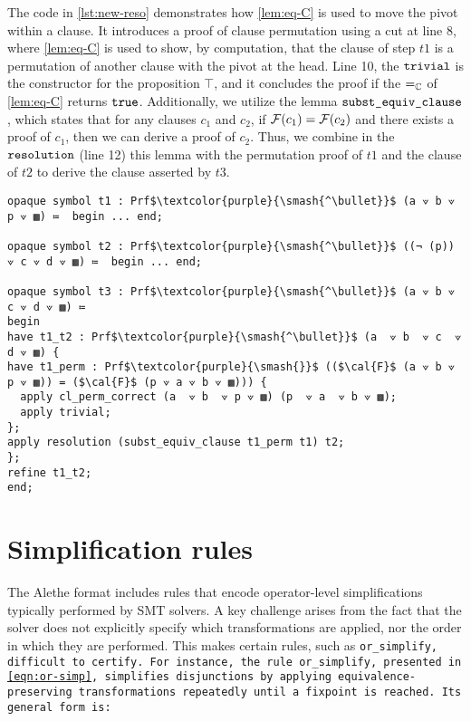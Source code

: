 \begin{example}
The code in \cref{lst:new-reso} demonstrates how \cref{lem:eq-C} is used to move the pivot within a clause.
It introduces a proof of clause permutation using a cut at line 8, where \cref{lem:eq-C} is used to show, by computation, that the clause of step $t1$ is a permutation of another clause with the pivot at the head.
Line 10, the $\tt{trivial}$ is the constructor for the proposition $\top$, and it concludes the proof if the $=_{\bb{C}}$ of \cref{lem:eq-C} returns $\tt{true}$. %
Additionally, we utilize the lemma $\tt{subst\_equiv\_clause}$, which states that for any clauses $c_1$ and $c_2$, if $\cal{F}(c_1) = \cal{F}(c_2)$ and there exists a proof of $c_1$, then we can derive a proof of $c_2$.
Thus, we combine in the $\tt{resolution}$ (line 12) this lemma with the permutation proof of $t1$ and the clause of $t2$ to derive the clause asserted by $t3$.

\begin{lstlisting}[mathescape=true, caption={Reflective resolutions}, label={lst:new-reso}, language=Lambdapi]
opaque symbol t1 : Prf$\textcolor{purple}{\smash{^\bullet}}$ (a ⟇ b ⟇ p ⟇ ▩) ≔  begin ... end;

opaque symbol t2 : Prf$\textcolor{purple}{\smash{^\bullet}}$ ((¬ (p)) ⟇ c ⟇ d ⟇ ▩) ≔  begin ... end;

opaque symbol t3 : Prf$\textcolor{purple}{\smash{^\bullet}}$ (a ⟇ b ⟇ c ⟇ d ⟇ ▩) ≔
begin
have t1_t2 : Prf$\textcolor{purple}{\smash{^\bullet}}$ (a  ⟇ b  ⟇ c  ⟇ d ⟇ ▩) {
have t1_perm : Prf$\textcolor{purple}{\smash{}}$ (($\cal{F}$ (a ⟇ b ⟇ p ⟇ ▩)) = ($\cal{F}$ (p ⟇ a ⟇ b ⟇ ▩))) {
  apply cl_perm_correct (a  ⟇ b  ⟇ p ⟇ ▩) (p  ⟇ a  ⟇ b ⟇ ▩);
  apply trivial;
};
apply resolution (subst_equiv_clause t1_perm t1) t2;
};
refine t1_t2;
end;
\end{lstlisting}

\end{example}

\section{Simplification rules}

The Alethe format includes rules that encode operator-level simplifications typically performed by SMT solvers. 
A key challenge arises from the fact that the solver does not explicitly specify which transformations are applied, nor the order in which they are performed. This makes certain rules, such as \tt{or\_simplify}, difficult to certify.
For instance, the rule \texttt{or\_simplify}, presented in \cref{eqn:or-simp}, simplifies disjunctions by applying equivalence-preserving transformations repeatedly until a fixpoint is reached. Its general form is:

